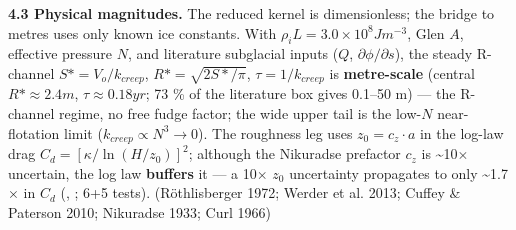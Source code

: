 \documentclass[11pt]{article}
\begin{document}
\textbf{4.3 Physical magnitudes.} The reduced kernel is dimensionless; the bridge to metres uses only known ice constants. With $\rho _{i}L=3.0\times 10^{8} J m^{-3}$, Glen $A$, effective pressure $N$, and literature subglacial inputs ($Q$, $\partial \phi /\partial s$), the steady R-channel $S*=V_{o}/k_{creep}$, $R*=\sqrt{2S*/\pi }$, $\tau =1/k_{creep}$ is \textbf{metre-scale} (central $R*\approx 2.4 m$, $\tau \approx 0.18 yr$; 73 \% of the literature box gives 0.1–50 m) — the R-channel regime, no free fudge factor; the wide upper tail is the low-$N$ near-flotation limit ($k_{creep}\propto N^{3}\to 0$). The roughness leg uses $z_{0}=c_{z}\cdot a$ in the log-law drag $C_{d}=[\kappa /\ln(H/z_{0})]^{2}$; although the Nikuradse prefactor $c_{z}$ is \textasciitilde{}10\ensuremath{\times} uncertain, the log law \textbf{buffers} it — a 10\ensuremath{\times} $z_{0}$ uncertainty propagates to only \textasciitilde{}1.7\ensuremath{\times} in $C_{d}$ (, ; 6+5 tests). (Röthlisberger 1972; Werder et al. 2013; Cuffey \& Paterson 2010; Nikuradse 1933; Curl 1966)
\end{document}
